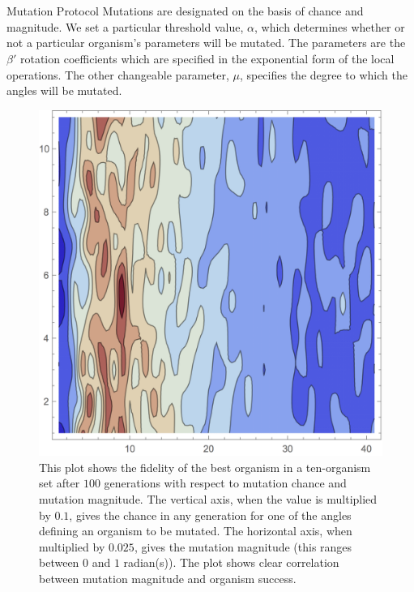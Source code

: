 \documentclass[12pt]{beamer}
\renewcommand{\maketitle}{%
	\begin{center}%
		\Huge\inserttitle\\[5mm]%
		\Large\insertauthor\\[5mm]%
		\Large\insertinstitute%
	\end{center}%
	\vspace*{-1.5ex}%
}
\begin{document}
\begin{frame}{\maketitle}
\begin{columns}
\begin{column}{.45\textwidth}
\begin{exampleblock}{Mutation Protocol}
	Mutations are designated on the basis of chance and magnitude. We set a particular threshold value, $\alpha$, which determines whether or not a particular organism's parameters will be mutated. The parameters are the $\beta '$ rotation coefficients which are specified in the exponential form of the local operations. The other changeable parameter, $\mu$, specifies the degree to which the angles will be mutated.
	\begin{figure}[htpb]
		\centering
			\includegraphics[scale=1]{efficiency_plot_col.png}
		\centering
		\caption{This plot shows the fidelity of the best organism in a ten-organism set after $100$ generations with respect to mutation chance and mutation magnitude. The vertical axis, when the value is multiplied by $0.1$, gives the chance in any generation for one of the angles defining an organism to be mutated. The horizontal axis, when multiplied by $0.025$, gives the mutation magnitude (this ranges between $0$ and $1$ radian(s)). The plot shows clear correlation between mutation magnitude and organism success.}
		\label{fig:effplot}
	\end{figure}
	
\end{exampleblock}
\vspace{1em}


\end{column}
\end{columns}
\end{frame}
\end{document}
